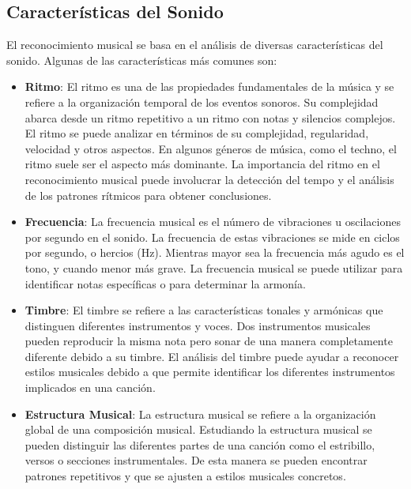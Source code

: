 \subsection{Características del Sonido}

El reconocimiento musical se basa en el análisis de diversas características del sonido. Algunas de las características más comunes son:

\begin{itemize}
\item \textbf{Ritmo}: El ritmo es una de las propiedades fundamentales de la música y se refiere a la organización temporal de los eventos sonoros. Su complejidad abarca desde un ritmo repetitivo a un ritmo con notas y silencios complejos.
El ritmo se puede analizar en términos de su complejidad, regularidad, velocidad y otros aspectos. En algunos géneros de música, como el techno, el ritmo suele ser el aspecto más dominante.
La importancia del ritmo en el reconocimiento musical puede involucrar la detección del tempo y el análisis de los patrones rítmicos para obtener conclusiones. \cite{Crossley-Holland}

\item \textbf{Frecuencia}: La frecuencia musical es el número de vibraciones u oscilaciones por segundo en el sonido. 
La frecuencia de estas vibraciones se mide en ciclos por segundo, o hercios (Hz). Mientras mayor sea la frecuencia más agudo es el tono, y cuando menor más grave.
La frecuencia musical se puede utilizar para identificar notas específicas o para determinar la armonía.

\item \textbf{Timbre}: El timbre se refiere a las características tonales y armónicas que distinguen diferentes instrumentos y voces. 
Dos instrumentos musicales pueden reproducir la misma nota pero sonar de una manera completamente diferente debido a su timbre.
El análisis del timbre puede ayudar a reconocer estilos musicales debido a que permite identificar los diferentes instrumentos implicados en una canción.

\item \textbf{Estructura Musical}: La estructura musical se refiere a la organización global de una composición musical.
Estudiando la estructura musical se pueden distinguir las diferentes partes de una canción como el estribillo, versos o secciones instrumentales. De esta manera se pueden encontrar patrones repetitivos y que se ajusten a estilos musicales concretos.
\end{itemize}

